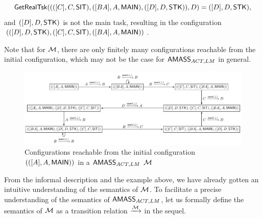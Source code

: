 \begin{example}
\begin{itemize}
$$\mathsf{GetRealTsk}((([C], C, {\sf SIT}), ([BA], A , {\sf MAIN}), ([D], D, {\sf STK})), D) = ([D], D, {\sf STK}),$$
and $([D], D, {\sf STK})$ is not the main task, resulting in  the configuration $(([D], D, {\sf STK}), ([C], C, {\sf SIT}), ([BA], A , {\sf MAIN}))$.
\end{itemize}
Note that for ${\mathcal{M} }$, there are only finitely many configurations reachable from the initial configuration, which may not be the case for $\textsf{AMASS}_{ACT,LM}$ in general.  
    

    
\begin{figure}
        \centering
        \includegraphics[scale = 0.75]{iff-example.pdf}
        \caption{Configurations reachable from the initial configuration $(([A], A,{\sf MAIN}))$ in a $\textsf{AMASS}_{ACT,LM}$ ${\mathcal{M} }$}
    \label{iff-example}
\end{figure}

\end{example}

From the informal description and the example above, we have already gotten an intuitive understanding of the semantics of ${\mathcal{M} }$. 
To facilitate a precise understanding of the semantics of $\textsf{AMASS}_{ACT,LM}$, let us formally define the semantics of ${\mathcal{M} }$ as a transition relation $\xrightarrow{{\mathcal{M} }} $ in the sequel. 

